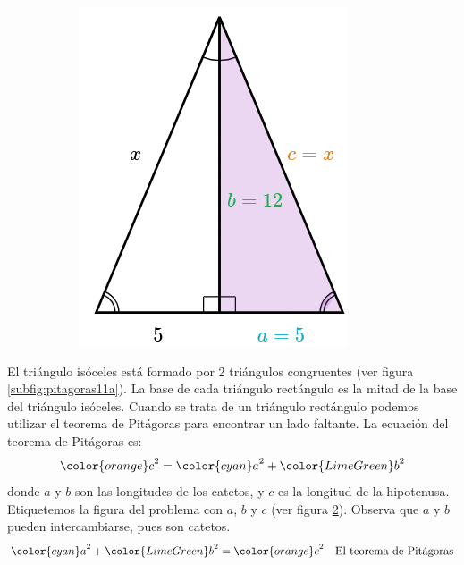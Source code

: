 \begin{solutionbox}{6.5cm}
\begin{figure}
\begin{subfigure}{0.45\linewidth}
            \includegraphics[width=\linewidth]{../images/pitagoras11b.png}
            \caption{}
            \label{subfig:pitagoras11b}
        \end{subfigure}
    \end{figure}%
    El triángulo isóceles está formado por 2 triángulos congruentes (ver figura \ref{subfig:pitagoras11a}).
    La base de cada triángulo rectángulo es la mitad de la base del triángulo isóceles.
    Cuando se trata de un triángulo rectángulo podemos utilizar el teorema de Pitágoras para encontrar un lado faltante.
    La ecuación del teorema de Pitágoras es:
    \[{\color{orange}c}^2={\color{cyan}a}^2+{\color{LimeGreen}b}^2\]
    donde $a$ y $b$ son las longitudes de los catetos, y $c$ es la longitud de la hipotenusa.
    Etiquetemos la figura del problema con $a$, $b$ y $c$ (ver figura \ref{subfig:pitagoras11b}).
    Observa que $a$ y $b$ pueden intercambiarse, pues son catetos.
    \begin{align*}
        {\color{cyan}a}^2+{\color{LimeGreen}b}^2  ={\color{orange}c}^2  & \text{\quad El teorema de Pitágoras}                          \\

\end{align*}
\end{solutionbox}
